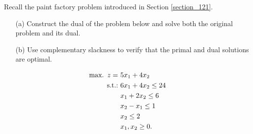 Recall the paint factory problem introduced in Section \ref{section_121}.

\begin{itemize}
\item[(a)] Construct the dual of the problem below and solve both the original problem and its dual. 
\item[(b)] Use complementary slackness to verify that the primal and dual solutions are optimal.
\end{itemize}
%
\begin{align*}
	\mathop{\text{max.~}} z = \ & 5x_1 + 4x_2 \\
	\mathop{\text{s.t.:~}} & 6x_1 + 4x_2 \leq 24 \\
	& x_1 + 2x_2 \leq 6 \\
	& x_2 - x_1 \leq 1 \\
	& x_2 \leq 2 \\
	& x_1, x_2 \geq 0.
\end{align*}